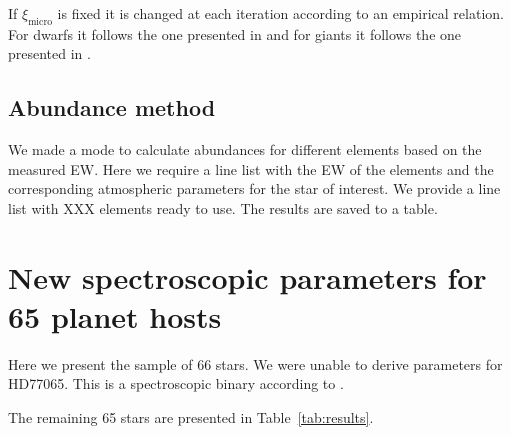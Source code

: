 \documentclass{aa}
\begin{document}
If $\xi_\mathrm{micro}$ is fixed it is changed at each iteration according to
an empirical relation. For dwarfs it follows the one presented in
\citet{Tsantaki2013} and for giants it follows the one presented in
\citet{Adibekyan2015}.



\subsection{Abundance method}
\label{sub:Abundance_method}

We made a mode to calculate abundances for different elements based on the
measured EW. Here we require a line list with the EW of the elements and
the corresponding atmospheric parameters for the star of interest. We provide
a line list with XXX elements ready to use. The results are saved to a table.











\section{New spectroscopic parameters for 65 planet hosts}
\label{sec:results}
Here we present the sample of 66 stars. We were unable to derive parameters for
HD77065. This is a spectroscopic binary according to \cite{Pourbaix2004}.

The remaining 65 stars are presented in Table~\ref{tab:results}.
\end{document}
